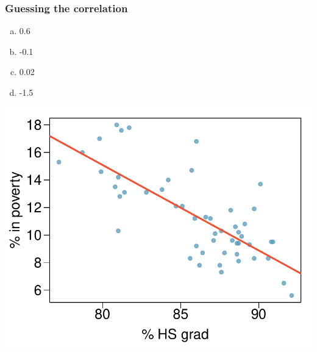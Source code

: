 
\begin{frame}
\frametitle{Guessing the correlation}

{
\begin{enumerate}[(a)]
\item 0.6
\item -0.1
\item 0.02
\item -1.5
\end{enumerate}
}
{
\begin{center}
\includegraphics[width=\textwidth]{8-1_linefit_res_corr/figures/poverty/poverty_hsgrad_line}
\end{center}
}

\end{frame}



